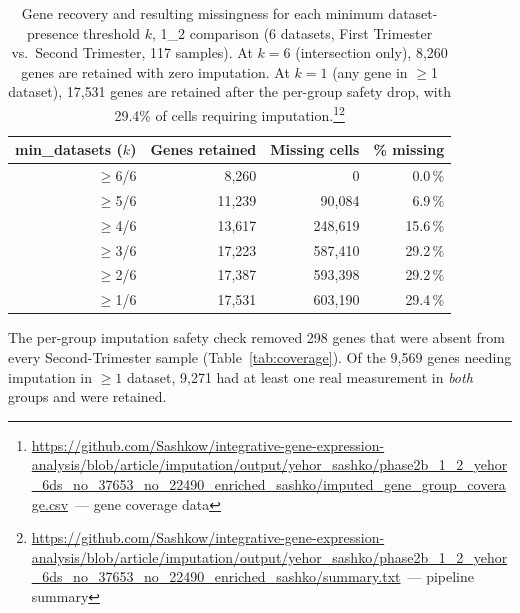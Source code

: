 \documentclass[11pt,a4paper]{article}
\newcommand{\ghb}{https://github.com/Sashkow/integrative-gene-expression-analysis/blob/article/imputation}
\newcommand{\src}[2]{\footnote{\url{\ghb/#1}~--- #2}}
\begin{document}
\begin{table}[h]
\centering
\footnotesize
\begin{tabular}{@{}rrrr@{}}
\toprule
\textbf{min\_datasets ($k$)} & \textbf{Genes retained} &
  \textbf{Missing cells} & \textbf{\% missing} \\
\midrule
$\ge$6/6 &  8{,}260 &         0 &  0.0\,\% \\
$\ge$5/6 & 11{,}239 &  90{,}084 &  6.9\,\% \\
$\ge$4/6 & 13{,}617 & 248{,}619 & 15.6\,\% \\
$\ge$3/6 & 17{,}223 & 587{,}410 & 29.2\,\% \\
$\ge$2/6 & 17{,}387 & 593{,}398 & 29.2\,\% \\
$\ge$1/6 & 17{,}531 & 603{,}190 & 29.4\,\% \\
\bottomrule
\end{tabular}
\caption{Gene recovery and resulting missingness for each
  minimum dataset-presence threshold $k$, 1\_2 comparison
  (6 datasets, First Trimester vs.~Second Trimester,
  117 samples). At $k = 6$ (intersection only), 8{,}260 genes
  are retained with zero imputation. At $k = 1$ (any gene in
  $\ge$1 dataset), 17{,}531 genes are retained after the
  per-group safety drop, with
  29.4\% of cells requiring imputation.\src{output/yehor_sashko/phase2b_1_2_yehor_6ds_no_37653_no_22490_enriched_sashko/imputed_gene_group_coverage.csv}{gene coverage data}\src{output/yehor_sashko/phase2b_1_2_yehor_6ds_no_37653_no_22490_enriched_sashko/summary.txt}{pipeline summary}}
\label{tab:recovery}
\end{table}

The per-group imputation safety check
removed 298 genes that were absent from every
Second-Trimester sample (Table~\ref{tab:coverage}). Of the
9{,}569 genes needing imputation in $\ge\!1$ dataset, 9{,}271
had at least one real measurement in \emph{both} groups and were
retained.
\end{document}
